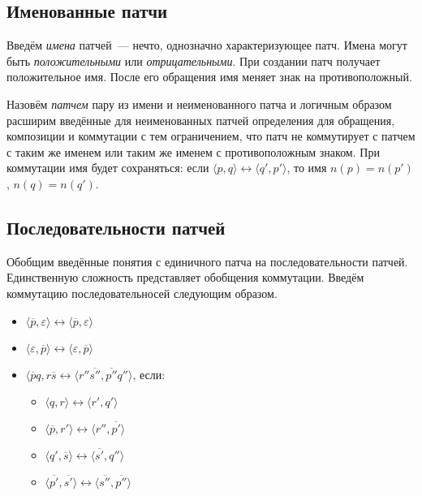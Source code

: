 \subsection{Именованные патчи}

Введём \emph{имена} патчей~--- нечто, однозначно характеризующее патч.
Имена могут быть \emph{положительными} или \emph{отрицательными}. При
создании патч получает положительное имя. После его обращения имя
меняет знак на противоположный. 

Назовём \emph{патчем} пару из имени и неименованного патча и логичным
образом расширим введённые для неименованных патчей определения для
обращения, композиции и коммутации с тем ограничением, что патч не
коммутирует с патчем с таким же именем или таким же именем с
противоположным знаком. При коммутации имя будет сохраняться: если
$\langle p, q \rangle \longleftrightarrow \langle q', p' \rangle$, то
имя $n(p) = n(p')$, $n(q) = n(q')$.

\subsection{Последовательности патчей}

Обобщим введённые понятия с единичного патча на последовательности
патчей. Единственную сложность представляет обобщения коммутации.
Введём коммутацию последовательносей следующим образом.

\begin{itemize}
\item $\langle \overline{p}, \varepsilon \rangle \longleftrightarrow
  \langle \overline{p}, \varepsilon \rangle$
\item $\langle \varepsilon, \overline{p} \rangle \longleftrightarrow
  \langle \varepsilon, \overline{p} \rangle$
\item $\langle \overline{p}q, r\overline{s} \longleftrightarrow
  \langle r''\overline{s''}, \overline{p''}q''
  \rangle$, если:
  \begin{itemize}
  \item $\langle q, r \rangle \longleftrightarrow \langle r', q' \rangle$
  \item $\langle \overline{p}, r' \rangle \longleftrightarrow \langle
    r'', \overline{p'} \rangle$
  \item $\langle q', \overline{s} \rangle \longleftrightarrow \langle
    \overline{s'}, q'' \rangle$
  \item $\langle \overline{p'}, \overline{s'} \rangle
    \longleftrightarrow \langle \overline{s''}, \overline{p''} \rangle$
  \end{itemize}
\end{itemize}


